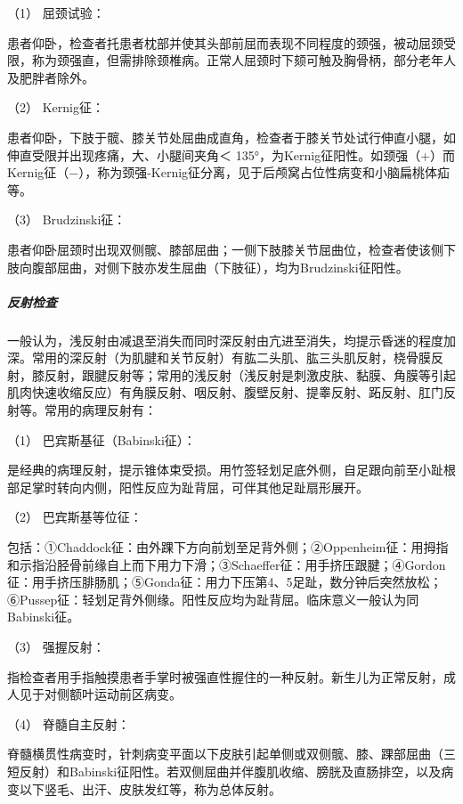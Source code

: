 \hypertarget{text00010.htmlux5cux23CHP1-2-2-1-3-5-1}{}
（1） 屈颈试验：

患者仰卧，检查者托患者枕部并使其头部前屈而表现不同程度的颈强，被动屈颈受限，称为颈强直，但需排除颈椎病。正常人屈颈时下颏可触及胸骨柄，部分老年人及肥胖者除外。

\hypertarget{text00010.htmlux5cux23CHP1-2-2-1-3-5-2}{}
（2） Kernig征：

患者仰卧，下肢于髋、膝关节处屈曲成直角，检查者于膝关节处试行伸直小腿，如伸直受限并出现疼痛，大、小腿间夹角＜
135°，为Kernig征阳性。如颈强（+）而Kernig征（−），称为颈强-Kernig征分离，见于后颅窝占位性病变和小脑扁桃体疝等。

\hypertarget{text00010.htmlux5cux23CHP1-2-2-1-3-5-3}{}
（3） Brudzinski征：

患者仰卧屈颈时出现双侧髋、膝部屈曲；一侧下肢膝关节屈曲位，检查者使该侧下肢向腹部屈曲，对侧下肢亦发生屈曲（下肢征），均为Brudzinski征阳性。

\subparagraph{反射检查}

一般认为，浅反射由减退至消失而同时深反射由亢进至消失，均提示昏迷的程度加深。常用的深反射（为肌腱和关节反射）有肱二头肌、肱三头肌反射，桡骨膜反射，膝反射，跟腱反射等；常用的浅反射（浅反射是刺激皮肤、黏膜、角膜等引起肌肉快速收缩反应）有角膜反射、咽反射、腹壁反射、提睾反射、跖反射、肛门反射等。常用的病理反射有：

\hypertarget{text00010.htmlux5cux23CHP1-2-2-1-3-6-1}{}
（1） 巴宾斯基征（Babinski征）：

是经典的病理反射，提示锥体束受损。用竹签轻划足底外侧，自足跟向前至小趾根部足掌时转向内侧，阳性反应为趾背屈，可伴其他足趾扇形展开。

\hypertarget{text00010.htmlux5cux23CHP1-2-2-1-3-6-2}{}
（2） 巴宾斯基等位征：

包括：①Chaddock征：由外踝下方向前划至足背外侧；②Oppenheim征：用拇指和示指沿胫骨前缘自上而下用力下滑；③Schaeffer征：用手挤压跟腱；④Gordon征：用手挤压腓肠肌；⑤Gonda征：用力下压第4、5足趾，数分钟后突然放松；⑥Pussep征：轻划足背外侧缘。阳性反应均为趾背屈。临床意义一般认为同Babinski征。

\hypertarget{text00010.htmlux5cux23CHP1-2-2-1-3-6-3}{}
（3） 强握反射：

指检查者用手指触摸患者手掌时被强直性握住的一种反射。新生儿为正常反射，成人见于对侧额叶运动前区病变。

\hypertarget{text00010.htmlux5cux23CHP1-2-2-1-3-6-4}{}
（4） 脊髓自主反射：

脊髓横贯性病变时，针刺病变平面以下皮肤引起单侧或双侧髋、膝、踝部屈曲（三短反射）和Babinski征阳性。若双侧屈曲并伴腹肌收缩、膀胱及直肠排空，以及病变以下竖毛、出汗、皮肤发红等，称为总体反射。

